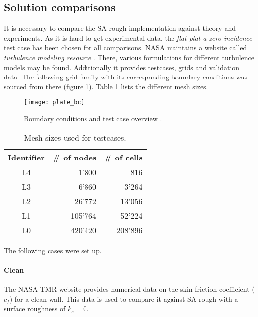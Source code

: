 \subsection{Solution comparisons}
It is necessary to compare the SA rough implementation against theory and
experiments. As it is hard to get experimental data, the \textit{flat plat a
zero incidence} test case has been chosen for all comparisons. NASA maintains a
website called \textit{turbulence modeling resource} \cite{rumsey_flat}. There,
various formulations for different turbulence models may be found. Additionally
it provides testcases, grids and validation data. The following grid-family with
its corresponding boundary conditions was sourced from there (figure
\ref{fig:plate_bc}). Table \ref{tab:plate_sizes} lists the different mesh sizes.

\begin{figure}[H] \centering
\texttt{[image: plate\_bc]}
    \caption{Boundary conditions and test case overview \cite{rumsey_flat}.}
    \label{fig:plate_bc}
\end{figure}

\begin{table}[H]
  \centering
  \begin{tabular}{c r r}
    Identifier      & \# of nodes   & \# of cells \\
    \toprule
    L4              & 1'800         & 816 \\
    L3              & 6'860         & 3'264 \\
    L2              & 26'772        & 13'056 \\
    L1              & 105'764       & 52'224 \\
    L0              & 420'420       & 208'896 \\

  \end{tabular}
  \caption{Mesh sizes used for testcases.}
  \label{tab:plate_sizes}
\end{table}

\noindent The following cases were set up.

\paragraph{Clean}
The NASA TMR website \cite{rumsey_flat} provides numerical data on the skin
friction coefficient ($c_{f}$) for a clean wall. This data is used to compare it
against SA rough with a surface roughness of $k_{s} = 0$.

